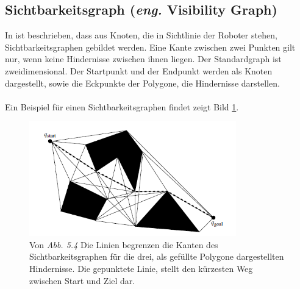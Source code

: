 \subsection{Sichtbarkeitsgraph (\textit{eng.} Visibility Graph)}
%
%
In \cite{Principles:05} ist beschrieben, dass aus Knoten, die in Sichtlinie der Roboter stehen, Sichtbarkeitsgraphen gebildet werden. Eine Kante zwischen zwei Punkten gilt nur, wenn keine Hindernisse zwischen ihnen liegen. Der Standardgraph ist zweidimensional. Der Startpunkt und der Endpunkt werden als Knoten dargestellt, sowie die Eckpunkte der Polygone, die Hindernisse darstellen.
\\\\
Ein Beispiel für einen Sichtbarkeitsgraphen findet zeigt Bild \ref{sec3a}.
\begin{figure} %
	\centering
	\includegraphics[width=0.8\textwidth]{images/Robot_Motion_Visibility_Graph.png}
	\caption{Von \cite[~S. 111]{Principles:05} \textit{Abb. 5.4} Die Linien begrenzen die Kanten des Sichtbarkeitsgraphen für die drei, als gefüllte Polygone dargestellten Hindernisse. Die gepunktete Linie, stellt den kürzesten Weg zwischen Start und Ziel dar.}
	\label{sec3a}
\end{figure}


